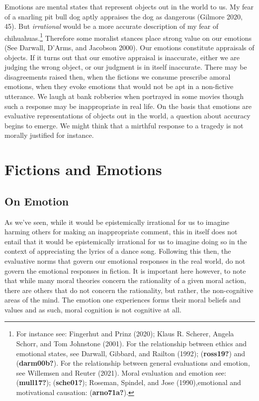 \documentclass[12pt]{book}
\theoremstyle{definition}
\theoremstyle{remark}
\begin{document}
Emotions are mental states that represent objects out in the world to us. My fear of a snarling pit bull dog aptly appraises the dog as dangerous (Gilmore 2020, 45). But \emph{irrational} would be a more accurate description of my fear of chihuahuas.\footnote{For instance see: Fingerhut and Prinz (2020); Klaus R. Scherer, Angela Schorr, and Tom Johnstone (2001). For the relationship between ethics and emotional states, see Darwall, Gibbard, and Railton (1992); (\textbf{ross19?}) and (\textbf{darm00b?}). For the relationship between general evaluations and emotion, see Willemsen and Reuter (2021). Moral evaluation and emotion see: (\textbf{mull17?}); (\textbf{sche01?}); Roseman, Spindel, and Jose (1990),emotional and motivational causation: (\textbf{arno71a?}).} Therefore some moralist stances place strong value on our emotions (See Darwall, D'Arms, and Jacobson 2000). Our emotions constitute appraisals of objects. If it turns out that our emotive appraisal is inaccurate, either we are judging the wrong object, or our judgment is in itself inaccurate. There may be disagreements raised then, when the fictions we consume prescribe amoral emotions, when they evoke emotions that would not be apt in a non-fictive utterance. We laugh at bank robberies when portrayed in some movies though such a response may be inappropriate in real life. On the basis that emotions are evaluative representations of objects out in the world, a question about accuracy begins to emerge. We might think that a mirthful response to a tragedy is not morally justified for instance.

\section{Fictions and Emotions}\label{fictions-and-emotions}

\subsection*{On Emotion}\label{on-emotion}

As we've seen, while it would be epistemically irrational for us to imagine harming others for making an inappropriate comment, this in itself does not entail that it would be epistemically irrational for us to imagine doing so in the context of appreciating the lyrics of a dance song. Following this then, the evaluative norms that govern our emotional responses in the real world, do not govern the emotional responses in fiction. It is important here however, to note that while many moral theories concern the rationality of a given moral action, there are others that do not concern the rationality, but rather, the non-cognitive areas of the mind. The emotion one experiences forms their moral beliefs and values and as such, moral cognition is not cognitive at all.
\end{document}
